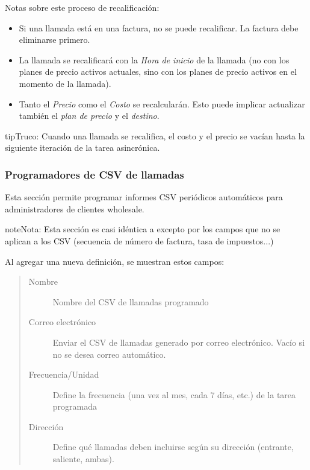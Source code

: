 \documentclass[letterpaper,10pt,spanish]{sphinxmanual}
\begin{document}
Notas sobre este proceso de recalificación:
\begin{itemize}
\item {} 
Si una llamada está en una factura, no se puede recalificar. La factura debe eliminarse primero.

\item {} 
La llamada se recalificará con la \emph{Hora de inicio} de la llamada (no con los planes de precio activos actuales, sino con los planes de precio activos en el momento de la llamada).

\item {} 
Tanto el \emph{Precio} como el \emph{Costo} se recalcularán. Esto puede implicar actualizar también el \emph{plan de precio} y el \emph{destino}.

\end{itemize}

\begin{notice}{tip}{Truco:}
Cuando una llamada se recalifica, el costo y el precio se vacían hasta la siguiente iteración de la tarea asincrónica.
\end{notice}


\subsubsection{Programadores de CSV de llamadas}
\label{administration_portal/client/wholesale/calls/call_csv_schedulers:call-csv-schedulers}\label{administration_portal/client/wholesale/calls/call_csv_schedulers::doc}
Esta sección permite programar informes CSV periódicos automáticos para administradores de clientes wholesale.

\begin{notice}{note}{Nota:}
Esta sección es casi idéntica a {\hyperref[administration_portal/brand/invoicing/invoice_schedulers:invoice\string-schedulers]{}} excepto por los campos que no se aplican a los CSV (secuencia de número de factura, tasa de impuestos...)
\end{notice}

Al agregar una nueva definición, se muestran estos campos:
\begin{quote}
\begin{description}
\item[{Nombre}] \leavevmode
Nombre del CSV de llamadas programado

\item[{Correo electrónico}] \leavevmode
Enviar el CSV de llamadas generado por correo electrónico. Vacío si no se desea correo automático.

\item[{Frecuencia/Unidad}] \leavevmode
Define la frecuencia (una vez al mes, cada 7 días, etc.) de la tarea programada

\item[{Dirección}] \leavevmode
Define qué llamadas deben incluirse según su dirección (entrante, saliente, ambas).

\end{description}
\end{quote}
\end{document}
